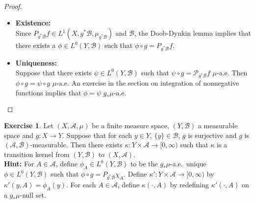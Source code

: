 \documentclass[12pt]{amsart}
\theoremstyle{definition}
\newtheorem{ex}[definition]{Exercise}
\newcommand{\kap}{\kappa}
\newcommand{\MA}{\mathcal{A}}
\newcommand{\MB}{\mathcal{B}}
\newcommand{\MP}{\mathcal{P}}
\newcommand{\Rg}{[0,\infty)}
\begin{document}
	\begin{proof}\
		\begin{itemize}
			\item \textbf{Existence:} \\
			Since $P_{g^*\MB}f \in L^1(X, g^*\MB, \mu_{g^*\MB})$ and $\MB$, the Doob-Dynkin lemma implies that there exists a $\phi \in L^0(Y, \MB)$ such that $\phi \circ g = P_{g^*\MB}f$.
			\item \textbf{Uniqueness:} \\
			Suppose that there exists $\psi \in L^0(Y, \MB)$ such that $\psi \circ g = \MP_{g^*\MB}f$ $\mu$-a.e. Then $\phi \circ g = \psi \circ g$ $\mu$-a.e. An exercise in the section on integration of nonnegative functions implies that $\phi = \psi$ $g_*\mu$-a.e.
		\end{itemize} 
	\end{proof}
	
	\begin{ex}
		Let $(X, \MA, \mu)$ be a finite measure space, $(Y, \MB)$ a measurable space and $g: X \rightarrow Y$. Suppose that for each $y \in Y$, $\{y\} \in \MB$, $g$ is surjective and $g$ is $(\MA, \MB)$-measurable. Then there exists $\kap: Y \times \MA \rightarrow \Rg$ such that $\kap$ is a transition kernel from $(Y, \MB)$ to $(X, \MA)$.\\
		\textbf{Hint:} For $A \in \MA$, define $\phi_A \in L^0(Y, \MB )$ to be the $g_*\mu$-a.e.\ unique $\phi \in L^0(Y, \MB)$ such that $\phi \circ g = P_{g^*\MB} \chi_A$. Define $\kap': Y \times \MA \rightarrow \Rg$ by $\kap'(y, A) = \phi_A(y)$. For each $A \in \MA$, define $\kap(\cdot, A)$ by redefining $\kap'(\cdot, A)$ on a $g_*\mu$-null set.
	\end{ex}
	
\end{document}
